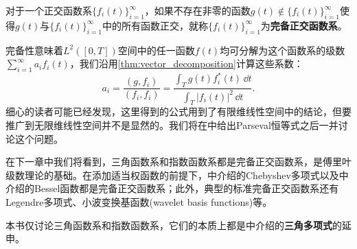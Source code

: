 \begin{definition}[完备正交函数系]
    对于一个正交函数系$\{f_i(t)\}_{i=1}^{\infty}$，如果不存在非零的函数$g(t)\notin\{f_i(t)\}_{i=1}^{\infty}$使得$g(t)$与$\{f_i(t)\}_{i=1}^{\infty}$中的所有函数正交，就称$\{f_i(t)\}_{i=1}^{\infty}$为\textbf{完备正交函数系}。
\end{definition}

完备性意味着$L^2([0,T])$空间中的任一函数$f(t)$均可分解为这个函数系的级数$\sum_{i = 1}^{\infty} a_i f_i(t)$，我们沿用\cref{thm:vector_decomposition}计算这些系数：
\begin{equation}
    a_i=\frac{(g,f_i)}{(f_i,f_i)}=\frac{\int_{T}g(t)f_i^*(t)\,\dd t}{\int_{T}|f_i(t)|^2\,\dd t}.
\end{equation}
细心的读者可能已经发现，这里得到的公式用到了有限维线性空间中的结论，但要推广到无限维线性空间并不是显然的。我们将在中给出Parseval恒等式之后一并讨论这个问题。

在下一章中我们将看到，三角函数系和指数函数系都是完备正交函数系，是傅里叶级数理论的基础。在添加适当权函数的前提下，中介绍的Chebyshev多项式以及中介绍的Bessel函数都是完备正交函数系；此外，典型的标准完备正交函数系还有Legendre多项式、小波变换基函数(wavelet basis functions)等。

本书仅讨论三角函数系和指数函数系，它们的本质上都是中介绍的\textbf{三角多项式}的延申。
